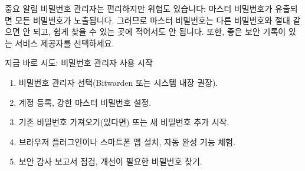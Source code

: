 \begin{tcbwarn}{중요 알림}
비밀번호 관리자는 편리하지만 위험도 있습니다: 마스터 비밀번호가 유출되면 모든 비밀번호가 노출됩니다. 그러므로 마스터 비밀번호는 다른 비밀번호와 절대 같으면 안 되고, 쉽게 찾을 수 있는 곳에 적어서도 안 됩니다. 또한, 좋은 보안 기록이 있는 서비스 제공자를 선택하세요.

\end{tcbwarn}

\begin{tcbpractice}{지금 바로 시도: 비밀번호 관리자 사용 시작}
\begin{enumerate}
  \item 비밀번호 관리자 선택(Bitwarden 또는 시스템 내장 권장).
  \item 계정 등록, 강한 마스터 비밀번호 설정.
  \item 기존 비밀번호 가져오기(있다면) 또는 새 비밀번호 추가 시작.
  \item 브라우저 플러그인이나 스마트폰 앱 설치, 자동 완성 기능 체험.
  \item 보안 감사 보고서 점검, 개선이 필요한 비밀번호 찾기.
\end{enumerate}

\end{tcbpractice}
